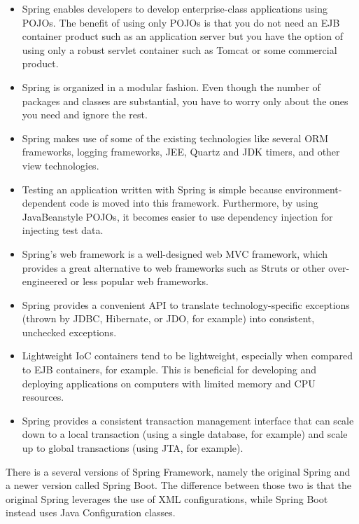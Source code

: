 \documentclass[thesis=M,english,hidelinks]{FITthesis}[2019/12/23]
\begin{document}
\begin{itemize}
	\item Spring enables developers to develop enterprise-class applications using POJOs. The benefit of using only POJOs is that you do not need an EJB container product such as an application server but you have the option of using only a robust servlet container such as Tomcat or some commercial product.
	
	\item Spring is organized in a modular fashion. Even though the number of packages and classes are substantial, you have to worry only about the ones you need and ignore the rest.
	
	\item Spring makes use of some of the existing technologies like several ORM frameworks, logging frameworks, JEE, Quartz and JDK timers, and other view technologies.
	
	\item Testing an application written with Spring is simple because environment-dependent code is moved into this framework. Furthermore, by using JavaBeanstyle POJOs, it becomes easier to use dependency injection for injecting test data.
	
	\item Spring's web framework is a well-designed web MVC framework, which provides a great alternative to web frameworks such as Struts or other over-engineered or less popular web frameworks.
	
	\item Spring provides a convenient API to translate technology-specific exceptions (thrown by JDBC, Hibernate, or JDO, for example) into consistent, unchecked exceptions.
	
	\item Lightweight IoC containers tend to be lightweight, especially when compared to EJB containers, for example. This is beneficial for developing and deploying applications on computers with limited memory and CPU resources.
	
	\item Spring provides a consistent transaction management interface that can scale down to a local transaction (using a single database, for example) and scale up to global transactions (using JTA, for example).
\end{itemize}

There is a several versions of Spring Framework, namely the original Spring and a newer version called Spring Boot. The difference between those two is that the original Spring leverages the use of \gls{XML} configurations, while Spring Boot instead uses Java Configuration classes.
\end{document}
